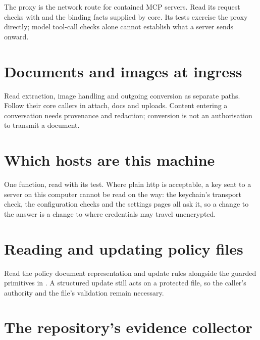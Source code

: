 The proxy is the network route for contained MCP servers. Read its request checks with  and the binding facts supplied by core. Its tests exercise the proxy directly; model tool-call checks alone cannot establish what a server sends onward.


\chapter{Documents and images at ingress}

Read extraction, image handling and outgoing conversion as separate paths. Follow their core callers in attach, docs and uploads. Content entering a conversation needs provenance and redaction; conversion is not an authorisation to transmit a document.




\chapter{Which hosts are this machine}

One function, read with its test. Where plain http is acceptable, a key sent to a server on this computer cannot be read on the way: the keychain's transport check, the configuration checks and the settings pages all ask it, so a change to the answer is a change to where credentials may travel unencrypted.


\chapter{Reading and updating policy files}

Read the policy document representation and update rules alongside the guarded primitives in . A structured update still acts on a protected file, so the caller's authority and the file's validation remain necessary.



\chapter{The repository's evidence collector}


